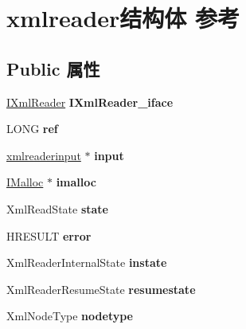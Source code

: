 \hypertarget{structxmlreader}{}\section{xmlreader结构体 参考}
\label{structxmlreader}
\subsection*{Public 属性}
\begin{DoxyCompactItemize}
\item 
\mbox{\label{structxmlreader_a72917f4f6276f716e71a002d75aeaa3d}} 
\hyperlink{interface_i_xml_reader}{I\+Xml\+Reader} {\bfseries I\+Xml\+Reader\+\_\+iface}
\item 
\mbox{\label{structxmlreader_acf07eb22b4ebca9246775cc7515cc428}} 
L\+O\+NG {\bfseries ref}
\item 
\mbox{\label{structxmlreader_a751fe6b0b4b55e774ce416197ea34373}} 
\hyperlink{structxmlreaderinput}{xmlreaderinput} $\ast$ {\bfseries input}
\item 
\mbox{\label{structxmlreader_a389cd0ac10308a6418995244a5078ca5}} 
\hyperlink{interface_i_malloc}{I\+Malloc} $\ast$ {\bfseries imalloc}
\item 
\mbox{\label{structxmlreader_a2a61e0ddee1c487de50e8c02e56826fa}} 
Xml\+Read\+State {\bfseries state}
\item 
\mbox{\label{structxmlreader_a13536b912c7ccfce3e608f9d8f408f5a}} 
H\+R\+E\+S\+U\+LT {\bfseries error}
\item 
\mbox{\label{structxmlreader_ad9fff1bee73b28a65526655430197458}} 
Xml\+Reader\+Internal\+State {\bfseries instate}
\item 
\mbox{\label{structxmlreader_a36c4071fe16cba3eec82d5c8df3c85db}} 
Xml\+Reader\+Resume\+State {\bfseries resumestate}
\item 
\mbox{\label{structxmlreader_a05654142ea3f2d8a34cdde5b876d1ea4}} 
Xml\+Node\+Type {\bfseries nodetype}
\item 

\end{DoxyCompactItemize}
